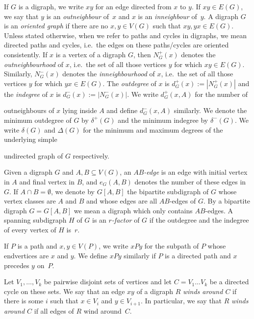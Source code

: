 \documentclass{memo-l}
\def\COMMENT#1{}
\numberwithin{section}{chapter}
\numberwithin{equation}{section}
\numberwithin{firstthm}{section}
\numberwithin{figure}{section}
\begin{document}
If $G$ is a digraph, we write $xy$ for an edge directed from $x$ to $y$. If $xy\in E(G)$, we say that $y$ is an
\emph{outneighbour} of~$x$ and $x$ is an \emph{inneighbour} of~$y$.
 A digraph $G$ is an \emph{oriented graph} if there are no $x,y\in V(G)$ such that $xy, yx\in E(G)$.
Unless stated otherwise, when we
refer to paths and cycles in digraphs, we mean directed paths and cycles, i.e.~the edges on these paths/cycles are oriented consistently.
If $x$ is a vertex of a digraph $G$, then $N^+_G(x)$ denotes the \emph{outneighbourhood} of $x$, i.e.~the
set of all those vertices $y$ for which $xy\in E(G)$. Similarly, $N^-_G(x)$ denotes the \emph{inneighbourhood} of $x$, i.e.~the
set of all those vertices $y$ for which $yx\in E(G)$. The \emph{outdegree} of $x$ is $d^+_G(x):=|N^+_G(x)|$ and the
\emph{indegree} of $x$ is $d^-_G(x):=|N^-_G(x)|$. 
We write $d^+_G(x,A)$ for the number of%
\COMMENT{Andy: deleted `all'} 
outneighbours of $x$ lying inside $A$ and define $d^-_G(x,A)$ similarly.
We denote the minimum outdegree of $G$ by $\delta^+(G)$ and the minimum indegree by $\delta^-(G)$.
We write $\delta(G)$ and $\Delta(G)$ for the minimum and maximum degrees of the underlying simple%
   \COMMENT{Daniela: added simple}
undirected graph of $G$ respectively.%
\COMMENT{AL: added definitions of $\delta(G)$ and $\Delta(G)$. use this convention in e.g. the proof of Lemma~\ref{lma:EF-bipartite}}

Given a digraph $G$ and $A,B\subseteq V(G)$, an \emph{$AB$-edge} is an edge with initial vertex in $A$ and final vertex in $B$,
and $e_G(A,B)$ denotes the number of these edges in~$G$. If $A\cap B=\emptyset$, we denote by $G[A,B]$ the bipartite subdigraph of $G$
whose vertex classes are $A$ and $B$ and whose edges are all $AB$-edges of $G$.
By a bipartite digraph $G=G[A,B]$ we mean a digraph which only contains $AB$-edges.
A spanning subdigraph $H$ of $G$ is an \emph{$r$-factor} of $G$ if the outdegree and the indegree of every vertex of $H$ is~$r$.

If $P$ is a path and $x,y\in V(P)$, we write $xPy$ for the subpath of $P$ whose endvertices are $x$ and $y$.
We define $xPy$ similarly if $P$ is a directed path and $x$ precedes $y$ on~$P$.%
   \COMMENT{Daniela added these 2 sentences}

Let $V_1,\dots,V_k$ be pairwise disjoint sets of vertices and let $C=V_1\dots V_k$ be a directed cycle on these sets.
We say that an edge $xy$ of a digraph $R$ \emph{winds around $C$} if there is some $i$ such that $x\in V_i$ and $y\in V_{i+1}$.
In particular, we say that $R$ \emph{winds around $C$} if all edges of $R$ wind around~$C$.
\end{document}
